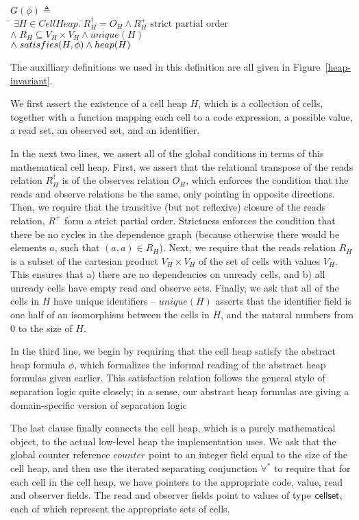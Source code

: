 \documentclass[preprint,natbib]{sigplanconf}
\begin{document}
\begin{tabbing}
    $G(\phi) \triangleq $ \\ 
\;\;\= $\exists H \in CellHeap.\;$\=$ R_H^\dagger = O_H \land R_H^+ \mbox{ strict partial order }$ \\
    \> \> $\land\; R_H \subseteq V_H \times V_H \land unique(H)$ \\
    \> \> $\land\; satisfies({H}, {\phi}) \land heap(H)$ \\
\end{tabbing}

The auxilliary definitions we used in this definition are all given in
Figure~\ref{heap-invariant}. 

We first assert the existence of a cell heap $H$, which is a
collection of cells, together with a function mapping each cell to a
code expression, a possible value, a read set, an observed set, and an
identifier. 

In the next two lines, we assert all of the global conditions in terms
of this mathematical cell heap. First, we assert that the relational
transpose of the reads relation $R^\dagger_H$ is of the observes
relation $O_H$, which enforces the condition that the reads and
observe relations be the same, only pointing in opposite
directions. Then, we require that the transitive (but not reflexive)
closure of the reads relation, $R^+$ form a strict partial
order. Strictness enforces the condition that there be no cycles in
the dependence graph (because otherwise there would be elements $a$,
such that $(a, a) \in R_H$).  Next, we require that the reads relation
$R_H$ is a subset of the cartesian product $V_H \times V_H$ of the set
of cells with values $V_H$. This ensures that a) there are no
dependencies on unready cells, and b) all unready cells have empty
read and observe sets. Finally, we ask that all of the cells in $H$
have unique identifiers -- $unique(H)$ asserts that the identifier
field is one half of an isomorphism between the cells in $H$, and the
natural numbers from 0 to the size of $H$.

In the third line, we begin by requiring that the cell heap satisfy
the abstract heap formula $\phi$, which formalizes the informal
reading of the abstract heap formulas given earlier. This satisfaction
relation follows the general style of separation logic quite closely; 
in a sense, our abstract heap formulas are giving a domain-specific
version of separation logic

The last clause finally connects the cell heap, which is a purely
mathematical object, to the actual low-level heap the implementation
uses. We ask that the global counter reference $counter$ point to an integer
field equal to the size of the cell heap, and then use the iterated
separating conjunction $\forall^*$ to require that for each cell in
the cell heap, we have pointers to the appropriate code, value, read
and observer fields. The read and observer fields point to values of
type $\mbox{\textsf{{cellset}}}$, each of which represent the appropriate sets of cells. 
\end{document}
